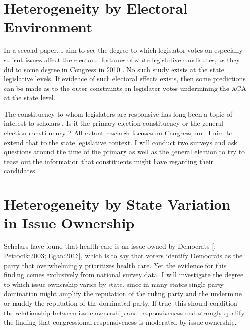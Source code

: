 \documentclass[
  oneside]{book}
\begin{document}
\hypertarget{heterogeneity-by-electoral-environment}{%
\section{Heterogeneity by Electoral Environment}\label{heterogeneity-by-electoral-environment}}

In a second paper, I aim to see the degree to which legislator votes on especially salient issues affect the electoral fortunes of state legislative candidates, as they did to some degree in Congress in 2010 \citep{Nyhan:2012}. No such study exists at the state legislative levels. If evidence of such electoral effects exists, then some predictions can be made as to the outer constraints on legislator votes undermining the ACA at the state level.

The constituency to whom legislators are responsive has long been a topic of interest to scholars \citep{Fenno:1978}. Is it the primary election constituency \citep{Brady:2007a, Hall:2013, Hall:2015} or the general election constituency \citep{Canes-Wrone:2002, Ansolabehere:2001}? All extant research focuses on Congress, and I aim to extend that to the state legislative context. I will conduct two surveys and ask questions around the time of the primary as well as the general election to try to tease out the information that constituents might have regarding their candidates.

\hypertarget{heterogeneity-by-state-variation-in-issue-ownership}{%
\section{Heterogeneity by State Variation in Issue Ownership}\label{heterogeneity-by-state-variation-in-issue-ownership}}

Scholars have found that health care is an issue owned by Democrats {[}\citet{Petrocik:1996}; Petrocik:2003; Egan:2013{]}, which is to say that voters identify Democrats as the party that overwhelmingly prioritizes health care. Yet the evidence for this finding comes exclusively from national survey data. I will investigate the degree to which issue ownership varies by state, since in many states single party domination might amplify the reputation of the ruling party and the undermine or muddy the reputation of the dominated party. If true, this should condition the relationship between issue ownership and responsiveness and strongly qualify the \citet{Egan:2013} finding that congressional responsiveness is moderated by issue ownership.
\end{document}
